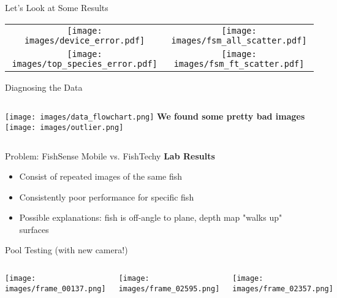 \begin{frame}{Let's Look at Some Results}
    \centering
    \begin{tabular}{@{}cc@{}}
        \texttt{[image: images/device\_error.pdf]} &
        \texttt{[image: images/fsm\_all\_scatter.pdf]} \\
        \texttt{[image: images/top\_species\_error.pdf]} &
        \texttt{[image: images/fsm\_ft\_scatter.pdf]} \\
    \end{tabular}
\end{frame}

\begin{frame}{Diagnosing the Data}
    \begin{columns}[c]
        \texttt{[image: images/data\_flowchart.png]}
        \textbf{We found some pretty bad images}
        \texttt{[image: images/outlier.png]}
    \end{columns}
\end{frame}


\begin{frame}{Problem: FishSense Mobile vs. FishTechy}
    \textbf{Lab Results}
    \begin{itemize}
        \item Consist of repeated images of the same fish
        \item Consistently poor performance for specific fish
        \item Possible explanations: fish is off-angle to plane, depth map "walks up" surfaces
    \end{itemize}
\end{frame}

\begin{frame}{Pool Testing (with new camera!)}
    \begin{columns}[c]
        \centering
        \texttt{[image: images/frame\_00137.png]}
        
        \centering
        \texttt{[image: images/frame\_02595.png]}
        
        \centering
        \texttt{[image: images/frame\_02357.png]}
    \end{columns}
\end{frame}
